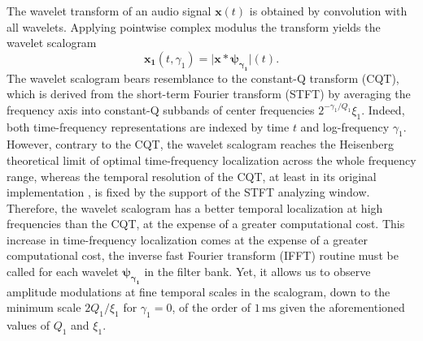 \documentclass[journal]{IEEEtran}
\begin{document}
The wavelet transform of an audio signal
$\boldsymbol{x}(t)$ is obtained by convolution with all wavelets.
Applying pointwise complex modulus the transform yields
the wavelet scalogram
\begin{equation}
\boldsymbol{x_1}(t, \gamma_1)
= \vert \boldsymbol{x} \ast \boldsymbol{\psi_{\gamma_1}} \vert (t)\mbox{.}
\end{equation}
The wavelet scalogram bears resemblance to the constant-Q transform (CQT),
which is derived from the short-term Fourier transform (STFT) by averaging the frequency
axis into constant-Q subbands of center frequencies $2^{-\gamma_1/Q_1}\xi_1$.
Indeed, both time-frequency representations are indexed by time $t$ and log-frequency $\gamma_1$.
However, contrary to the CQT, the wavelet scalogram reaches the Heisenberg
theoretical limit of optimal time-frequency localization across the whole
frequency range, whereas the temporal resolution of the CQT, at least in its original implementation \cite{Brown1992}, is fixed by the support of the STFT analyzing window.
Therefore, the wavelet scalogram has a better temporal localization at high
frequencies than the CQT, at the expense of a greater computational cost.
This increase in time-frequency localization comes at the expense of a greater computational cost, the inverse fast Fourier transform (IFFT) routine must be called for each wavelet $\boldsymbol{\psi_{\gamma_1}}$ in the filter bank.
Yet, it allows us to observe amplitude modulations at fine temporal scales in the scalogram, down to the minimum scale $2Q_1/\xi_1$ for $\gamma_1 = 0$, of the order of $1\,\textrm{ms}$ given the aforementioned values of $Q_1$ and $\xi_1$.
\end{document}
